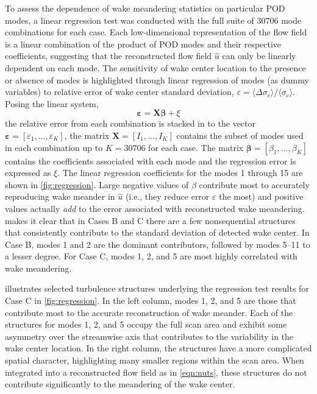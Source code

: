\documentclass[aip,amsmath,amssymb,preprint,]{revtex4-1}
\begin{document}
To assess the dependence of wake meandering statistics on particular POD modes, a linear regression test was conducted with the full suite of 30706 mode combinations for each case.
Each low-dimensional representation of the flow field is a linear combination of the product of POD modes and their respective coefficients, suggesting that the reconstructed flow field $\hat{u}$ can only be linearly dependent on each mode. 
The sensitivity of wake center location to the presence or absence of modes is highlighted through linear regression of modes (as dummy variables) to relative error of wake center standard deviation, $\varepsilon = \langle\Delta \sigma_c \rangle/ \langle\sigma_c \rangle$.
Posing the linear system,
\begin{equation}
  \bm{\varepsilon} = \bm{X}\bm{\beta} + \xi
  \label{eq:linearreg}
\end{equation}
the relative error from each combination is stacked in to the vector $\bm{\varepsilon} = [\varepsilon_1, ..., \varepsilon_K]$, the matrix $\bm{X} = [I_1, ..., I_K]$ contains the subset of modes used in each combination up to $K=30706$ for each case. 
The matrix $\bm{\beta} = [\beta_1, ..., \beta_K]$ contains the coefficients associated with each mode and the regression error is expressed as $\xi$.  
The linear regression coefficients for the modes 1 through 15 are shown in \cref{fig:regression}.
Large negative values of $\beta$ contribute most to accurately reproducing wake meander in $\hat{u}$ (i.e., they reduce error $\varepsilon$ the most) and positive values actually \emph{add} to the error associated with reconstructed wake meandering.
 makes it clear that in Cases B and C there are a few nonsequential structures that consistently contribute to the standard deviation of detected wake center. 
In Case B, modes 1 and 2 are the dominant contributors, followed by modes 5--11 to a lesser degree.
For Case C, modes 1, 2, and 5 are most highly correlated with wake meandering.


 illustrates selected turbulence structures underlying the regression test results for Case C in \cref{fig:regression}. 
In the left column, modes 1, 2, and 5 are those that contribute most to the accurate reconstruction of wake meander. 
Each of the structures for modes 1, 2, and 5 occupy the full scan area and exhibit some asymmetry over the streamwise axis that contributes to the variability in the wake center location.
In the right column, the structures have a more complicated spatial character, highlighting many smaller regions within the scan area. 
When integrated into a reconstructed flow field as in \cref{eqn:nuts}, these structures do not contribute significantly to the meandering of the wake center. 
\end{document}
